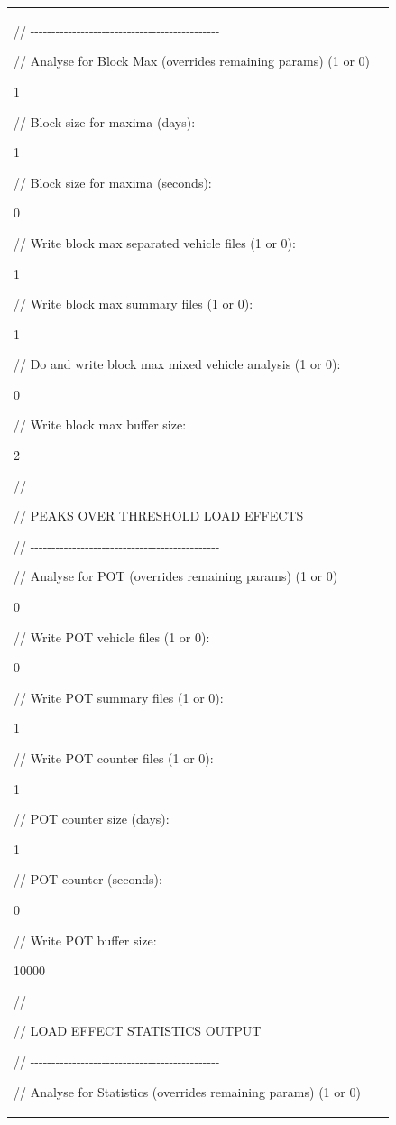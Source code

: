 \documentclass[
]{article}
\begin{document}
\begin{longtable}[]{@{}
  >{\centering\arraybackslash}p{}
  >{\raggedright\arraybackslash}p{}@{}}
//
-\/-\/-\/-\/-\/-\/-\/-\/-\/-\/-\/-\/-\/-\/-\/-\/-\/-\/-\/-\/-\/-\/-\/-\/-\/-\/-\/-\/-\/-\/-\/-\/-\/-\/-\/-\/-\/-\/-\/-\/-\/-\/-\/-\/-

// Analyse for Block Max (overrides remaining params) (1 or 0)

1

// Block size for maxima (days):

1

// Block size for maxima (seconds):

0

// Write block max separated vehicle files (1 or 0):

1

// Write block max summary files (1 or 0):

1

// Do and write block max mixed vehicle analysis (1 or 0):

0

// Write block max buffer size:

2

//

// PEAKS OVER THRESHOLD LOAD EFFECTS

//
-\/-\/-\/-\/-\/-\/-\/-\/-\/-\/-\/-\/-\/-\/-\/-\/-\/-\/-\/-\/-\/-\/-\/-\/-\/-\/-\/-\/-\/-\/-\/-\/-\/-\/-\/-\/-\/-\/-\/-\/-\/-\/-\/-\/-

// Analyse for POT (overrides remaining params) (1 or 0)

0

// Write POT vehicle files (1 or 0):

0

// Write POT summary files (1 or 0):

1

// Write POT counter files (1 or 0):

1

// POT counter size (days):

1

// POT counter (seconds):

0

// Write POT buffer size:

10000

//

// LOAD EFFECT STATISTICS OUTPUT

//
-\/-\/-\/-\/-\/-\/-\/-\/-\/-\/-\/-\/-\/-\/-\/-\/-\/-\/-\/-\/-\/-\/-\/-\/-\/-\/-\/-\/-\/-\/-\/-\/-\/-\/-\/-\/-\/-\/-\/-\/-\/-\/-\/-\/-

// Analyse for Statistics (overrides remaining params) (1 or 0)


\end{longtable}
\end{document}
